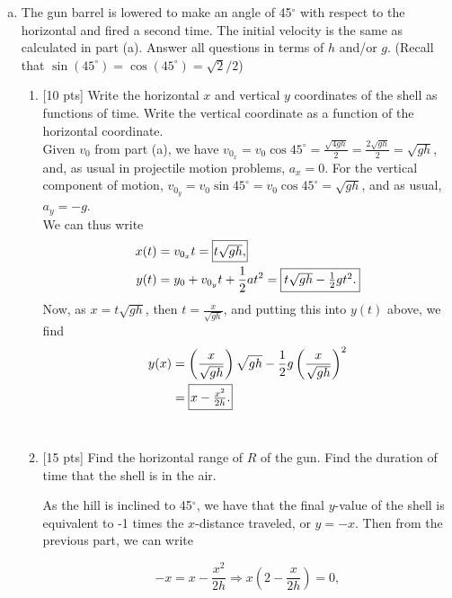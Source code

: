 \documentclass{article}[10pt]
\begin{document}
\begin{enumerate}
\begin{enumerate}[(a)]
\item The gun barrel is lowered to make an angle of 45$^\circ$ with respect to the horizontal and fired a second time. The initial velocity is the 
same as calculated in part (a). Answer all questions in terms of $h$ and/or $g$. (Recall that $\sin \left(45^\circ \right) = \cos \left( 45^\circ \right)
= \sqrt{2}/2$)

\begin{enumerate}[i]

\item {[}10 pts] Write the horizontal $x$ and vertical $y$ coordinates of the shell as functions of time. Write the vertical coordinate as a function
of the horizontal coordinate. \\ 

{\color{red} Given $v_0$ from part (a), we have $v_{0_x} = v_0 \cos 45^\circ = \frac{\sqrt{4gh}}{2} = \frac{2\sqrt{gh}}{2} = \sqrt{gh}$, 
and, as usual in projectile motion problems, $a_x = 0$. For the vertical component of motion, $v_{0_y} = v_0 \sin 45^\circ = 
v_0 \cos 45^\circ = \sqrt{gh}$, and as usual, $a_y = -g$. \\

We can thus write 
\begin{align*} x(t) &= v_{0_x} t = \framebox[1.1\width]{$t \sqrt{gh},$}\\
y(t) &= y_0 + v_{0_y} t + \frac{1}{2} a t^2 = \framebox[1.1\width]{$t \sqrt{gh} - \frac{1}{2} g t^2.$}
\end{align*}
Now, as $x = t \sqrt{gh}$, then $t = \frac{x}{\sqrt{gh}}$, and putting this into $y(t)$ above, we find
\begin{align*} y(x) &= \left( \frac{x}{\sqrt{gh}} \right) \sqrt{gh} - \frac{1}{2} g \left( \frac{x}{\sqrt{gh}} \right)^2 \\
&= \framebox[1.1\width]{$ x - \frac{x^2}{2h}$.}
\end{align*}} \\

\item {[}15 pts] Find the horizontal range of $R$ of the gun. Find the duration of time that the shell is in the air. \\

{\color{red} As the hill is inclined to 45$^\circ$, we have that the final $y$-value of the shell is equivalent to -1 times the $x$-distance traveled, 
or $y = -x$. Then from the previous part, we can write

$$ -x = x - \frac{x^2}{2h} \Longrightarrow x \left(2 - \frac{x}{2h} \right) = 0, $$

}
\end{enumerate}
\end{enumerate}
\end{enumerate}
\end{document}
